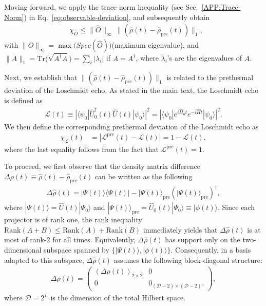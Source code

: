 \documentclass[aps,prl,amsfonts,floatfix,superscriptaddress,longbibliography,twocolumn,footinbib]{revtex4-2}
\begin{document}
Moving forward, we apply the trace-norm inequality (see  Sec.~\ref{APP:Trace-Norm}) in Eq.~\eqref{eq:observable-deviation}, and subsequently obtain  
\begin{align} \label{Eq:App:observable-trace-norm}
    & \chi_O\le \| \hat{O}\|_{\infty} ~ \|(\hat\rho(t) - \hat\rho_{\text{pre}}(t))\|_1,
\end{align}
with $ \| \hat{O}\|_\infty = \max{\biggr(Spec(\hat O)\biggr)} $(maximum eigenvalue), and $\| A \|_1= \text{Tr}\biggr(\sqrt{A^\dagger A} \biggr)= \sum_{i}|\lambda_i|$ if $A=A^\dagger $, where $\lambda_i $'s are the eigenvalues of $\hat A$. 

Next, we establish that $\|(\hat\rho(t) - \hat\rho_{\text{pre}}(t))\|_1$ is related to the prethermal deviation of the Loschmidt echo. As stated in the main text, the Loschmidt echo is defined as  
\begin{align}
    \mathcal{L}(t) \equiv | \langle \psi_0 | \hat U_0^\dagger(t) \hat U(t) | \psi_0 \rangle|^2   =| \langle \psi_0 | e^{i \hat H_0 t} e^{-i \hat H t} | \psi_0 \rangle |^2.
\end{align}
We then define the corresponding prethermal deviation of the Loschmidt echo as
\begin{align} \label{eq:APP:loschmidt-echo-deviation}
    \chi_{\mathcal L}(t) &=  | \mathcal{L}^{\text{pre}}(t) - \mathcal{L}(t)| = 1-\mathcal L(t),
\end{align}
where the last equality follows from the fact that $\mathcal{L}^{\text{pre}}(t) = 1$. 

To proceed, we first observe that the density matrix difference $ \Delta\rho(t) \equiv \hat\rho(t) - \hat\rho_{\text{pre}}(t)$ can be written as the following 
\begin{align}
    \Delta\hat{\rho}(t)  = |\Psi (t) \rangle \langle \Psi (t) | - |\Psi (t) \rangle_{\text{pre}} (|\Psi (t) \rangle_{\text{pre}})^\dagger,
\end{align}
where $|\Psi (t) \rangle= \hat U(t) |\Psi_0\rangle$ and $|\Psi (t) \rangle_{\text{pre}}= \hat U_0(t) |\Psi_0\rangle \equiv |\phi(t) \rangle $. Since each projector is of rank one, the rank inequality $\text{Rank} (A + B) \le \mathrm{Rank}(A) + \mathrm{Rank}(B)$ immediately yields that  $\Delta \hat{\rho} (t)$ is at most of rank-$2$ for all times. Equivalently, $\Delta \hat{\rho} (t)$ has support only on the two-dimensional subspace spanned by $\{ | \Psi(t)\rangle , |\phi(t)\rangle \}$. Consequently, in a basis adapted to this subspace,
$\Delta \hat{\rho}(t)$
assumes the following block-diagonal structure: 
\begin{align}
    \Delta\rho(t)  =  \begin{pmatrix}
    (\Delta \rho(t))_{2\times2} & 0 \\
    0 & 0_{(\mathcal{D}-2) \times (\mathcal{D}-2) }.
\end{pmatrix},
\end{align} 
where $\mathcal{D} = 2^{L}$ is the dimension of the total Hilbert space.
\end{document}
